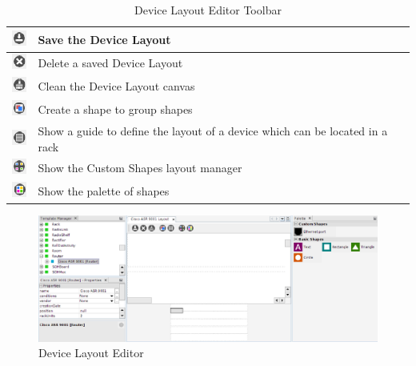 \documentclass[a4paper]{article}
\begin{document}
	\begin{table}[h!]
		\centering
		\begin{tabular}[h!]{lp{10cm}}
			\includegraphics[width=0.5cm]{img/device_layout_save.png} & Save the Device Layout\\
			\midrule
			\includegraphics[width=0.5cm]{img/device_layout_delete.png} & Delete a saved Device Layout\\
			\midrule
			\includegraphics[width=0.5cm]{img/device_layout_clean.png} & Clean the Device Layout canvas\\
			\midrule
			\includegraphics[width=0.5cm]{img/device_layout_group.png} & Create a shape to group shapes\\
			\midrule
			\includegraphics[width=0.5cm]{img/device_layout_guide.png} & Show a guide to define the layout of a device which can be located in a rack\\
			\midrule
			\includegraphics[width=0.5cm]{img/device_layout_custom_shapes.png} & Show the Custom Shapes layout manager\\
			\midrule
			\includegraphics[width=0.5cm]{img/device_layout_show_palette.png} & Show the palette of shapes\\
			\midrule
		\end{tabular}
		\caption{Device Layout Editor Toolbar}
		\label{tab:device_layout_editor_toolbar}
	\end{table}
		
	\begin{figure}[h!]
		\centering
		\includegraphics[width=0.9\linewidth]{img/device_layout_empty.png}
		\caption{Device Layout Editor}
		\label{fig:device_layout_empty}
	\end{figure}
	\newpage	
	
\end{document}
